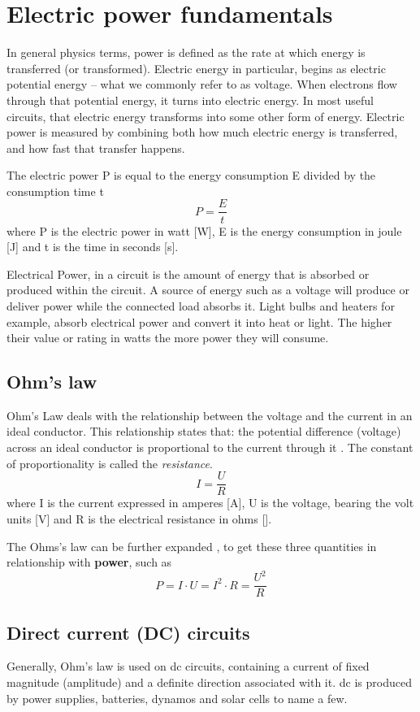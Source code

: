 \documentclass[journal]{IEEEtran}
\begin{document}
\section{Electric power fundamentals} \label{s:el_power}
In general physics terms, power is defined as the rate at which energy is transferred (or transformed). Electric energy in particular, begins as electric potential energy – what we commonly refer to as voltage. When electrons flow through that potential energy, it turns into electric energy. In most useful circuits, that electric energy transforms into some other form of energy. Electric power is measured by combining both how much electric energy is transferred, and how fast that transfer happens.

The electric power P is equal to the energy consumption E divided by the consumption time t \cite{meade2002foundations}
$$P = \frac Et$$
where P is the electric power in watt [W], E is the energy consumption in joule [J] and 
t is the time in seconds [s].

Electrical Power, in a circuit is the amount of energy that is absorbed or produced within the circuit. A source of energy such as a voltage will produce or deliver power while the connected load absorbs it. Light bulbs and heaters for example, absorb electrical power and convert it into heat or light. The higher their value or rating in watts the more power they will consume.

\subsection{Ohm's law}
Ohm's Law deals with the relationship between the voltage and the current in an ideal conductor. This relationship states that: the potential difference (voltage) across an ideal conductor is proportional to the current through it \cite{henry2008ohm}. The constant of proportionality is called the \textit{resistance}.
$$I = \frac U R $$
where I is the current expressed in amperes [A], U is the voltage, bearing the volt units [V] and R is the electrical resistance in ohms [\ohm].

The Ohms's law can be further expanded \cite{beaty1998electric}, to get these three quantities in relationship with \textbf{power}, such as
$$P = I \cdot U = I^2 \cdot R = \frac{U^2}R$$


\subsection{Direct current (DC) circuits}
Generally, Ohm's law is used on \gls{dc} circuits, containing a current of fixed magnitude (amplitude) and a definite direction associated with it. \acrlong{dc} is produced by power supplies, batteries, dynamos and solar cells to name a few.
\end{document}
